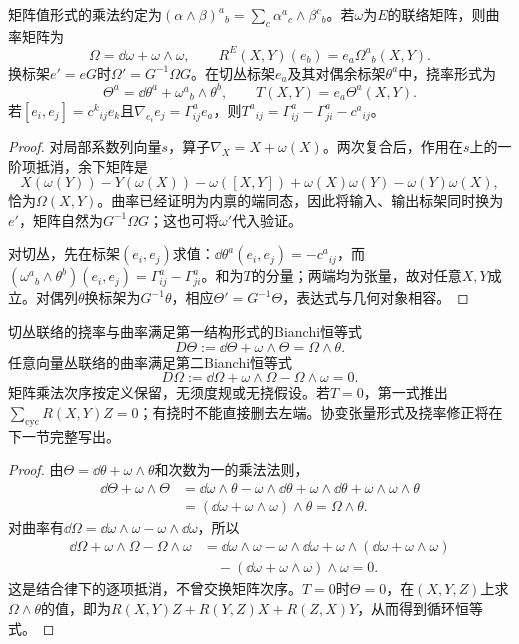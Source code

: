 \begin{proposition}[结构方程]\label{prop:cartan-structure}
矩阵值形式的乘法约定为$(\alpha\wedge\beta)^a{}_b=\sum_c\alpha^a{}_c\wedge\beta^c{}_b$。若$\omega$为$E$的联络矩阵，则曲率矩阵为
\[
 \Omega=\dd\omega+\omega\wedge\omega,
 \qquad R^E(X,Y)(e_b)=e_a\Omega^a{}_b(X,Y).
\]
换标架$e'=eG$时$\Omega'=G^{-1}\Omega G$。在切丛标架$e_a$及其对偶余标架$\theta^a$中，挠率形式为
\[
 \Theta^a=\dd\theta^a+\omega^a{}_b\wedge\theta^b,
 \qquad T(X,Y)=e_a\Theta^a(X,Y).
\]
若$[e_i,e_j]=c^k{}_{ij}e_k$且$\nabla_{e_i}e_j=\Gamma^a_{ij}e_a$，则$T^a{}_{ij}=\Gamma^a_{ij}-\Gamma^a_{ji}-c^a{}_{ij}$。
\end{proposition}
\begin{proof}
对局部系数列向量$s$，算子$\nabla_X=X+\omega(X)$。两次复合后，作用在$s$上的一阶项抵消，余下矩阵是
\[
 X(\omega(Y))-Y(\omega(X))-\omega([X,Y])
 +\omega(X)\omega(Y)-\omega(Y)\omega(X),
\]
恰为$\Omega(X,Y)$。曲率已经证明为内禀的端同态，因此将输入、输出标架同时换为$e'$，矩阵自然为$G^{-1}\Omega G$；这也可将$\omega'$代入验证。

对切丛，先在标架$(e_i,e_j)$求值：$\dd\theta^a(e_i,e_j)=-c^a{}_{ij}$，而$(\omega^a{}_b\wedge\theta^b)(e_i,e_j)=\Gamma^a_{ij}-\Gamma^a_{ji}$。和为$T$的分量；两端均为张量，故对任意$X,Y$成立。对偶列$\theta$换标架为$G^{-1}\theta$，相应$\Theta'=G^{-1}\Theta$，表达式与几何对象相容。
\end{proof}

\begin{theorem}[一般联络的Bianchi恒等式]\label{thm:bianchi-forms}
切丛联络的挠率与曲率满足第一结构形式的Bianchi恒等式
\[
 D\Theta:=\dd\Theta+\omega\wedge\Theta=\Omega\wedge\theta.
\]
任意向量丛联络的曲率满足第二Bianchi恒等式
\[
 D\Omega:=\dd\Omega+\omega\wedge\Omega-\Omega\wedge\omega=0.
\]
矩阵乘法次序按定义保留，无须度规或无挠假设。若$T=0$，第一式推出$\sum_{\mathrm{cyc}}R(X,Y)Z=0$；有挠时不能直接删去左端。协变张量形式及挠率修正将在下一节完整写出。
\end{theorem}
\begin{proof}
由$\Theta=\dd\theta+\omega\wedge\theta$和次数为一的乘法法则，
\begin{align*}
 \dd\Theta+\omega\wedge\Theta
 &=\dd\omega\wedge\theta-\omega\wedge\dd\theta
   +\omega\wedge\dd\theta+\omega\wedge\omega\wedge\theta\\
 &=(\dd\omega+\omega\wedge\omega)\wedge\theta=\Omega\wedge\theta.
\end{align*}
对曲率有$\dd\Omega=\dd\omega\wedge\omega-\omega\wedge\dd\omega$，所以
\begin{align*}
 \dd\Omega+\omega\wedge\Omega-\Omega\wedge\omega
 &=\dd\omega\wedge\omega-\omega\wedge\dd\omega
   +\omega\wedge(\dd\omega+\omega\wedge\omega)\\
 &\quad-(\dd\omega+\omega\wedge\omega)\wedge\omega=0.
\end{align*}
这是结合律下的逐项抵消，不曾交换矩阵次序。$T=0$时$\Theta=0$，在$(X,Y,Z)$上求$\Omega\wedge\theta$的值，即为$R(X,Y)Z+R(Y,Z)X+R(Z,X)Y$，从而得到循环恒等式。
\end{proof}

